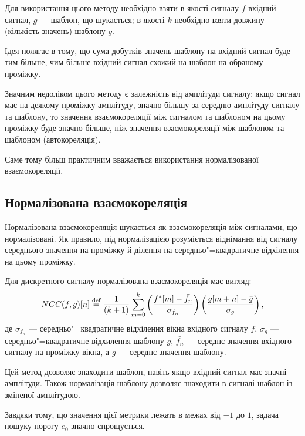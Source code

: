         Для використання цього методу необхідно взяти в якості сигналу $f$ вхідний сигнал, $g$ --- шаблон, що
        шукається; в якості $k$ необхідно взяти довжину (кількість значень) шаблону $g$.

        Ідея полягає в тому, що сума добутків значень шаблону на вхідний сигнал буде тим більше, чим більше вхідний
        сигнал схожий на шаблон на обраному проміжку.

        Значним недоліком цього методу є залежність від амплітуди сигналу: якщо сигнал має на деякому проміжку
        амплітуду, значно більшу за середню амплітуду сигналу та шаблону, то значення взаємокореляції між сигналом та
        шаблоном на цьому проміжку буде значно більше, ніж значення взаємокореляції між шаблоном та шаблоном
        (автокореляція).

        Саме тому більш практичним вважається використання нормалізованої взаємокореляції.
    \subsection{Нормалізована взаємокореляція}
        Нормалізована взаємокореляція шукається як взаємокореляція між сигналами, що нормалізовані.
        Як правило, під нормалізацією розуміється віднімання від сигналу середнього значення на проміжку й ділення на
        середньо"=квадратичне відхілення на цьому проміжку.

        Для дискретного сигналу нормалізована взаємокореляція має вигляд:
        \begin{equation}
            NCC(f,g)[ n ] \stackrel{\text{def}}{=} \frac{1}{\left(k+1\right)} \sum\limits_{m=0}^{k} \left(\frac{f^*[m] -\bar{f_n}}{\sigma_{f_n}}\right) \left(\frac{g[ m + n ]-\bar{g}}{\sigma_g}\right),
        \end{equation}
        де $\sigma_{f_n}$ --- середньо"=квадратичне відхілення вікна вхідного сигналу $f$, $\sigma_g$ ---
        середньо"=квадратичне відхилення шаблону $g$, $\bar{f_n}$ --- середнє значення вхідного сигналу на проміжку
        вікна, а $\bar{g}$ --- середнє значення шаблону.

        Цей метод дозволяє знаходити шаблон, навіть якщо вхідний сигнал має значні  амплітуди.
        Також нормалізація шаблону дозволяє знаходити в сигналі шаблон із зміненої амплітудою.

        Завдяки тому, що значення цієї метрики лежать в межах від ${-1}$ до $1$, задача пошуку порогу $e_0$ значно
        спрощується.


